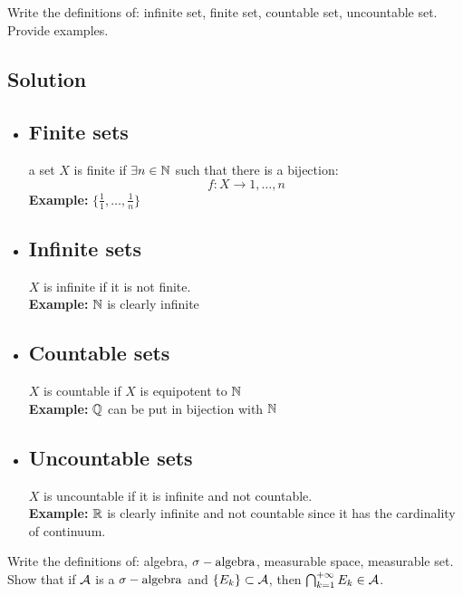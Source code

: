 
\question
Write the definitions of: infinite set, finite set, countable set, uncountable set. Provide examples.

\subsection*{Solution}
\provdefs
\begin{itemize}
    \item \subsection{Finite sets} a set $X$ is finite if $\exists n\in\mathbb{N}$ such that there is a bijection:
    \[
        f:X\to {1,\dots,n}    
    \]
    \textbf{Example:} $\{\frac{1}{1}, \dots, \frac{1}{n}\}$
    \item \subsection{Infinite sets} $X$ is infinite if it is not finite.\\
    \textbf{Example:} $\mathbb{N}$ is clearly infinite
    \item \subsection{Countable sets} $X$ is countable if $X$ is equipotent to $\mathbb{N}$\\
    \textbf{Example:} $\mathbb{Q}$ can be put in bijection with $\mathbb{N}$
    \item \subsection{Uncountable sets} $X$ is uncountable if it is infinite and not countable.\\
    \textbf{Example:} $\mathbb{R}$ is clearly infinite and not countable since it has the cardinality of continuum.
\end{itemize}


\question
Write the definitions of: algebra, $\sigma-\text{algebra}$, measurable space, measurable set. Show that if $\mathcal{A}$
is a $\sigma-\text{algebra}$ and $\{E_k\}\subset \mathcal{A}$, then $\bigcap^{+\infty}_{k=1} E_k \in \mathcal{A} $.

